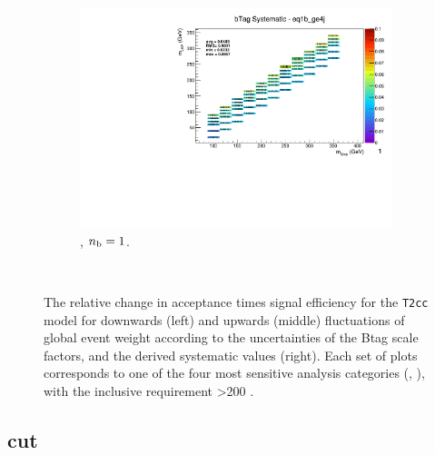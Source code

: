 \begin{figure}[ht!]
\begin{subfigure}[b]{0.32\textwidth}
    \includegraphics[width=\textwidth, page=1]{Figs/sms/t2cc/v37/systs_v2/T2cc_bTag_eq1b_ge4j.pdf}
    \caption{\njhigh, $n_{\text{b}} = 1$.}
  \end{subfigure}\\
  \caption{The relative change in acceptance times signal efficiency for the
  \texttt{T2cc} model for downwards (left) and upwards (middle) fluctuations
  of global event weight according to the uncertainties of the Btag scale 
  factors,
  and the derived systematic values (right). Each set of plots corresponds
  to one of the four most sensitive analysis categories (\nb, \nj), with the
  inclusive requirement \HT>200 \gev.}
  \label{fig:sms-btag-t2cc}
\end{figure}


\newpage
\subsection*{\mhtmet cut}
\label{sec:t2cc_mhtmet_plots}

